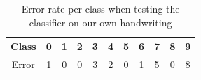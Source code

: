 \documentclass[%
        compressed,
        final,
        notitlepage,
        narroweqnarray,
        inline,
        twoside,
        ]{ieee}
\begin{document}
\begin{table}
    \centering
    \begin{tabular}{|c|cccccccccc|}
        \hline
        Class & 0 & 1 & 2 & 3 & 4 & 5 & 6 & 7 & 8 & 9 \\
        \hline
        Error & 1 & 0 & 0 & 3 & 2 & 0 & 1 & 5 & 0 & 8 \\
        \hline
    \end{tabular}
    \caption{Error rate per class when testing the classifier on our own
    handwriting}
    \label{tab:errorrate}
\end{table}

\printbibliography
\end{document}
